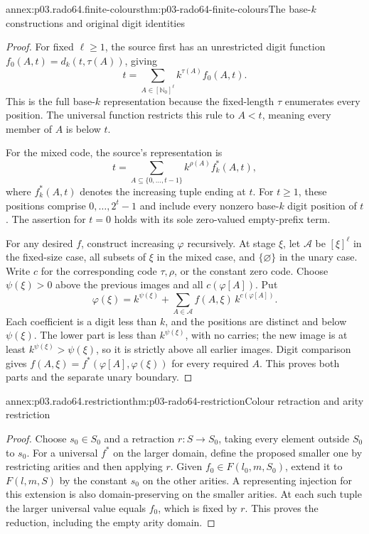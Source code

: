 \begin{annexitem}{annex:p03.rado64.finite-colours}{thm:p03-rado64-finite-colours}{The base-\(k\) constructions and original digit identities}
\begin{proof}
For fixed \(\ell\geq1\), the source first has an unrestricted digit
function \(f_0(A,t)=d_k(t,\tau(A))\), giving
\[
 t=\sum_{A\in[\mathbb N_0]^\ell}
           k^{\tau(A)}f_0(A,t).
\]
This is the full base-\(k\) representation because the fixed-length \(\tau\)
enumerates every position. The universal function restricts this rule to
\(A<t\), meaning every member of \(A\) is below \(t\).

For the mixed code, the source's representation is
\[
 t=\sum_{A\subseteq\{0,\ldots,t-1\}}
                 k^{\rho(A)} f_k^*(A,t),
\]
where \(f_k^*(A,t)\) denotes the increasing tuple ending at \(t\).
For \(t\geq1\), these positions comprise \(0,\ldots,2^t-1\) and include
every nonzero base-\(k\) digit position of \(t\). The assertion for
\(t=0\) holds with its sole zero-valued empty-prefix term.

For any desired \(f\), construct increasing \(\varphi\) recursively.
At stage \(\xi\), let \(\mathcal A\) be \([\xi]^\ell\) in the fixed-size
case, all subsets of \(\xi\) in the mixed case, and
\(\{\varnothing\}\) in the unary case. Write \(c\) for the corresponding
code \(\tau,\rho\), or the constant zero code.
Choose \(\psi(\xi)>0\) above the previous images and all \(c(\varphi[A])\).
Put
\[
 \varphi(\xi)=k^{\psi(\xi)}
       +\sum_{A\in\mathcal A} f(A,\xi)\,k^{c(\varphi[A])}.
\]
Each coefficient is a digit less than \(k\), and the positions are distinct
and below \(\psi(\xi)\). The lower part is less than \(k^{\psi(\xi)}\), with
no carries; the new image is at least \(k^{\psi(\xi)}>\psi(\xi)\), so it is
strictly above all earlier images.
Digit comparison gives
\(f(A,\xi)=f^*(\varphi[A],\varphi(\xi))\) for every required \(A\).
This proves both parts and the separate unary boundary.
\end{proof}
\end{annexitem}

\begin{annexitem}{annex:p03.rado64.restriction}{thm:p03-rado64-restriction}{Colour retraction and arity restriction}
\begin{proof}
Choose \(s_0\in S_0\) and a retraction \(r:S\to S_0\), taking every
element outside \(S_0\) to \(s_0\).
For a universal \(f^*\) on the larger domain, define the proposed smaller
one by restricting arities and then applying \(r\).
Given \(f_0\in F(l_0,m,S_0)\), extend it to \(F(l,m,S)\) by the constant
\(s_0\) on the other arities. A representing injection for this extension
is also domain-preserving on the smaller arities. At each such tuple
the larger universal value equals \(f_0\), which is fixed by \(r\).
This proves the reduction, including the empty arity domain.
\end{proof}
\end{annexitem}

